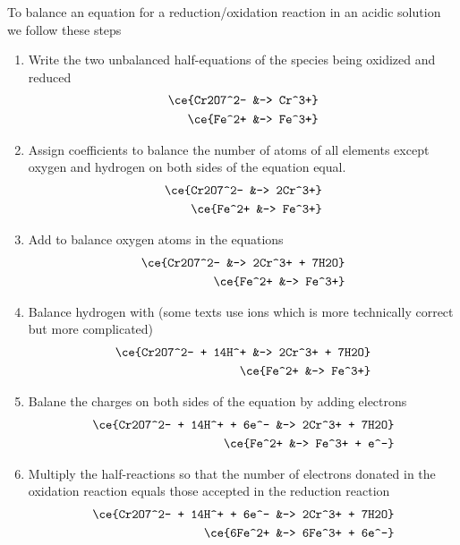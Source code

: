 \documentclass[../mit-general-chemistry.tex]{subfiles}
\begin{document}
To balance an equation for a reduction/oxidation reaction in an acidic
solution we follow these steps
\begin{enumerate}[label=\arabic*)]
\item Write the two unbalanced half-equations of the species being
  oxidized and reduced
  \begin{align*}
    \ce{Cr2O7^2- &-> Cr^3+}\\
    \ce{Fe^2+ &-> Fe^3+}\\
  \end{align*}

\item Assign coefficients to balance the number of atoms of all
  elements except oxygen and hydrogen on both sides of the equation
  equal.
  \begin{align*}
    \ce{Cr2O7^2- &-> 2Cr^3+}\\
    \ce{Fe^2+ &-> Fe^3+}\\
  \end{align*}

\item Add  to balance oxygen atoms in the equations
  \begin{align*}
    \ce{Cr2O7^2- &-> 2Cr^3+ + 7H2O}\\
    \ce{Fe^2+ &-> Fe^3+}\\
  \end{align*}

\item Balance hydrogen with  (some texts use \hydronium ions
  which is more technically correct but more complicated)
  \begin{align*}
    \ce{Cr2O7^2- + 14H^+ &-> 2Cr^3+ + 7H2O}\\
    \ce{Fe^2+ &-> Fe^3+}\\
  \end{align*}

\item Balane the charges on both sides of the equation by adding
  electrons
  \begin{align*}
    \ce{Cr2O7^2- + 14H^+ + 6e^- &-> 2Cr^3+ + 7H2O}\\
    \ce{Fe^2+ &-> Fe^3+ + e^-}\\
  \end{align*}

\item Multiply the half-reactions so that the number of electrons
  donated in the oxidation reaction equals those accepted in the
  reduction reaction
  \begin{align*}
    \ce{Cr2O7^2- + 14H^+ + 6e^- &-> 2Cr^3+ + 7H2O}\\
    \ce{6Fe^2+ &-> 6Fe^3+ + 6e^-}\\
  \end{align*}


\end{enumerate}
\end{document}
